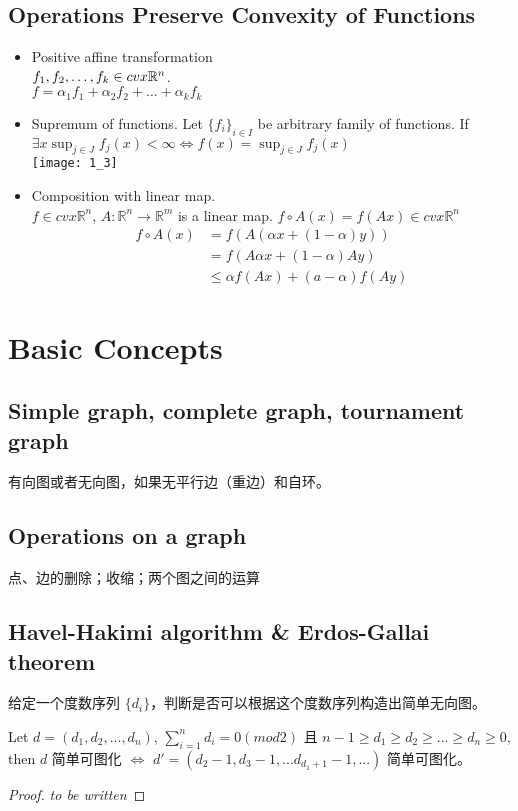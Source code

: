 \documentclass[11pt,fleqn]{book} %
\def\R{\mathbb{R}}
\begin{document}
\begin{CJK}{UTF8}{gkai}
\section{Operations Preserve Convexity of Functions}
\begin{itemize}
\item Positive affine transformation \\
$f_1,f_2,\ldots,f_k \in \space cvx \R^n$.\\
$f = \alpha_1 f_1 + \alpha_2 f_2 + \ldots + \alpha_k f_k$
\item Supremum of functions. Let $\{ f_i \}_{i \in I}$ be arbitrary family of functions. If $\exists x \sup_{j \in J} f_j(x) < \infty \Leftrightarrow f(x) = \sup_{j \in J} f_j(x) $\\
\texttt{[image: 1\_3]}
\item Composition with linear map.\\
$f \in cvx \R^n$, $A:\R^n \to \R^m$ is a linear map.
$f \circ A (x) = f(Ax) \in cvx \R^n$\\
\begin{align*}
f \circ A (x) & = f(A(\alpha x + (1-\alpha) y)) \\
& = f(A \alpha x + (1-\alpha) A y) \\
& \le \alpha f(Ax) + (a - \alpha) f(Ay)
\end{align*}
\end{itemize}

\chapter{Basic Concepts}

\section{Simple graph, complete graph, tournament graph}
\begin{definition}
 有向图或者无向图，如果无平行边（重边）和自环。
\end{definition}

\section{Operations on a graph}
点、边的删除；收缩；两个图之间的运算

\section{Havel-Hakimi algorithm \& Erdos-Gallai theorem}
给定一个度数序列 $\{d_i\}$，判断是否可以根据这个度数序列构造出简单无向图。
\begin{theorem}
     Let $d = (d_1, d_2, ...,d_n)$, $\sum_{i = 1}^n {d_i} = 0 (mod 2)$ 且 $n-1 \geq d_1 \geq 
    d_2 \geq ... \geq d_n \geq 0$, then $d$ 简单可图化 $\iff$ $d' = (d_2 - 1, d_3 - 1, ... d_{d_1 + 1} - 1, ...)$ 简单可图化。 
\end{theorem}
\begin{proof}
    \textit{to be written}
\end{proof}


\end{CJK}
\end{document}
